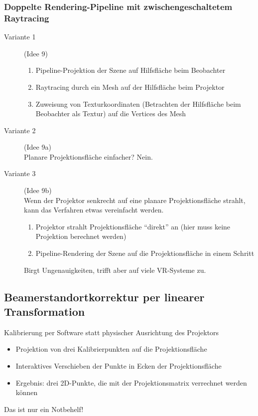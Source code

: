 \documentclass[a4paper, 12pt]{article}
\begin{document}
\subsubsection*{Doppelte Rendering-Pipeline mit zwischengeschaltetem Raytracing}
\begin{description}
  \item[Variante 1] (Idee 9)
    \begin{enumerate}
      \item Pipeline-Projektion der Szene auf Hilfsfläche beim Beobachter
      \item Raytracing durch ein Mesh auf der Hilfsfläche beim Projektor
      \item Zuweisung von Texturkoordinaten (Betrachten der Hilfsfläche beim Beobachter als Textur) auf die Vertices des Mesh
    \end{enumerate}
  \item[Variante 2] (Idee 9a)\\
    Planare Projektionsfläche einfacher? Nein.
  \item[Variante 3] (Idee 9b)\\
    Wenn der Projektor senkrecht auf eine planare Projektionsfläche strahlt, kann das Verfahren etwas vereinfacht werden.
    \begin{enumerate}
      \item Projektor strahlt Projektionsfläche ``direkt'' an (hier muss keine Projektion berechnet werden)
      \item Pipeline-Rendering der Szene auf die Projektionsfläche in einem Schritt
    \end{enumerate}
    Birgt Ungenauigkeiten, trifft aber auf viele VR-Systeme zu.
\end{description}


\subsection{Beamerstandortkorrektur per linearer Transformation}
Kalibrierung per Software statt physischer Ausrichtung des Projektors
\begin{itemize}
  \item Projektion von drei Kalibrierpunkten auf die Projektionsfläche
  \item Interaktives Verschieben der Punkte in Ecken der Projektionsfläche
  \item Ergebnis: drei 2D-Punkte, die mit der Projektionsmatrix verrechnet werden können
\end{itemize}
Das ist nur ein Notbehelf!
\end{document}
